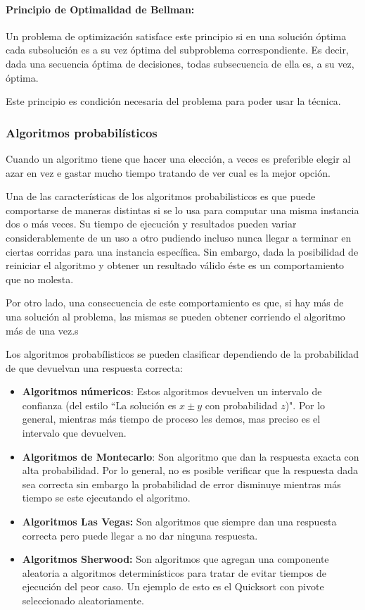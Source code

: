\paragraph{Principio de Optimalidad de Bellman:} Un problema de optimización satisface este principio si en una solución óptima cada subsolución es a su vez óptima del subproblema correspondiente. Es decir, dada una secuencia óptima de decisiones, todas subsecuencia de ella es, a su vez, óptima.

Este principio es condición necesaria del problema para poder usar la técnica. 

\subsubsection{Algoritmos probabilísticos}
Cuando un algoritmo tiene que hacer una elección, a veces es preferible elegir al azar en vez e gastar mucho tiempo tratando de ver cual es la mejor opción.

Una de las características de los algoritmos probabilisticos es que puede comportarse de maneras distintas si se lo usa para computar una misma instancia dos o más veces. Su tiempo de ejecución y resultados pueden variar considerablemente de un uso a otro pudiendo incluso nunca llegar a terminar en ciertas corridas para una instancia específica. Sin embargo, dada la posibilidad de reiniciar el algoritmo y obtener un resultado válido éste es un comportamiento que no molesta. 

Por otro lado, una consecuencia de este comportamiento es que, si hay más de una solución al problema, las mismas se pueden obtener corriendo el algoritmo más de una vez.s

Los algoritmos probabílisticos se pueden clasificar dependiendo de la probabilidad de que devuelvan una respuesta correcta:

\begin{itemize}
	\item \textbf{Algoritmos númericos}: Estos algoritmos devuelven un intervalo de confianza (del estilo ``La solución es \( x \pm y\) con probabilidad \(z\))". Por lo general, mientras más tiempo de proceso les demos, mas preciso es el intervalo que devuelven.
	\item \textbf{Algoritmos de Montecarlo}: Son algoritmo que dan la respuesta exacta con alta probabilidad. Por lo general, no es posible verificar que la respuesta dada sea correcta sin embargo la probabilidad de error disminuye mientras más tiempo se este ejecutando el algoritmo.
	\item \textbf{Algoritmos Las Vegas:} Son algoritmos que siempre dan una respuesta correcta pero puede llegar a no dar ninguna respuesta. 
	\item \textbf{Algoritmos Sherwood:} Son algoritmos que agregan una componente aleatoria a algoritmos determinísticos para tratar de evitar tiempos de ejecución del peor caso. Un ejemplo de esto es el Quicksort con pivote seleccionado aleatoriamente.
\end{itemize}

